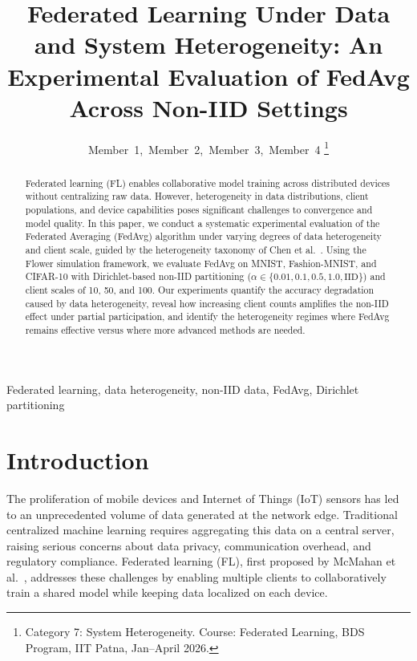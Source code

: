 \documentclass[journal]{IEEEtran}
\begin{document}
\title{Federated Learning Under Data and System Heterogeneity: An Experimental Evaluation of FedAvg Across Non-IID Settings}

\author{
Member~1,~Member~2,~Member~3,~Member~4
\thanks{Category 7: System Heterogeneity. Course: Federated Learning, BDS Program, IIT Patna, Jan--April 2026.}
}

\maketitle

\begin{abstract}
Federated learning (FL) enables collaborative model training across distributed devices without centralizing raw data. However, heterogeneity in data distributions, client populations, and device capabilities poses significant challenges to convergence and model quality. In this paper, we conduct a systematic experimental evaluation of the Federated Averaging (FedAvg) algorithm under varying degrees of data heterogeneity and client scale, guided by the heterogeneity taxonomy of Chen et al.~\cite{chen2025advances}. Using the Flower simulation framework, we evaluate FedAvg on MNIST, Fashion-MNIST, and CIFAR-10 with Dirichlet-based non-IID partitioning ($\alpha \in \{0.01, 0.1, 0.5, 1.0, \text{IID}\}$) and client scales of 10, 50, and 100. Our experiments quantify the accuracy degradation caused by data heterogeneity, reveal how increasing client counts amplifies the non-IID effect under partial participation, and identify the heterogeneity regimes where FedAvg remains effective versus where more advanced methods are needed.
\end{abstract}

\begin{IEEEkeywords}
Federated learning, data heterogeneity, non-IID data, FedAvg, Dirichlet partitioning
\end{IEEEkeywords}

\section{Introduction}
\label{sec:intro}

The proliferation of mobile devices and Internet of Things (IoT) sensors has led to an unprecedented volume of data generated at the network edge. Traditional centralized machine learning requires aggregating this data on a central server, raising serious concerns about data privacy, communication overhead, and regulatory compliance. Federated learning (FL), first proposed by McMahan et al.~\cite{mcmahan2017communication}, addresses these challenges by enabling multiple clients to collaboratively train a shared model while keeping data localized on each device.
\end{document}
